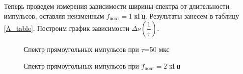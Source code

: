  Теперь проведем измерения зависимости ширины спектра от длительности импульсов, оставляя неизменным $ f_{повт} = 1 $ кГц. Результаты занесем в таблицу \ref{A_table}. Построим график зависимости $ \Delta \nu \left (\dfrac{1} {\tau} \right ) $. 
  \begin{figure}[h!]
  	\begin{minipage}[h]{0.5\linewidth}
  		\caption{Спектр прямоугольных импульсов при $\tau$=50 мкс}
  		\label{A_tau}
  	\end{minipage}
  	\begin{minipage}[h]{0.5\linewidth}
  		\caption{Спектр прямоугольных импульсов при $f_{повт}=2$ кГц}
  		\label{A_f}
  	\end{minipage}
  \end{figure}
  	
